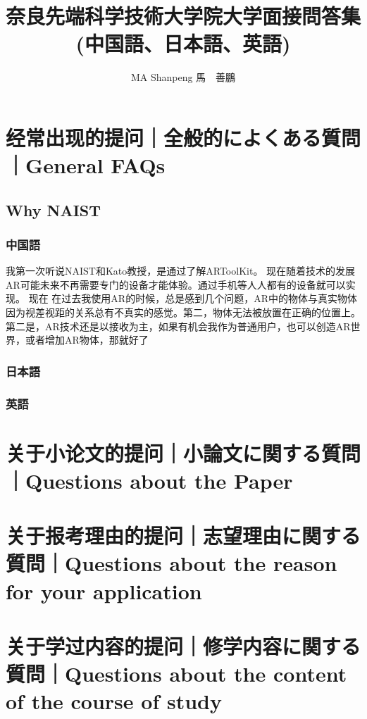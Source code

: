 \documentclass[lang=cn,11pt,a4paper]{elegantpaper}
\title{奈良先端科学技術大学院大学面接問答集\\(中国語、日本語、英語)}
\author{MA Shanpeng 馬　善鵬}
\institute{\href{https://inusturbo.github.io/}{個人ホームページ}}
\date{\zhtoday}
\begin{document}
\maketitle

\begin{abstract}


\end{abstract}

 \tableofcontents
 \newpage
\section{经常出现的提问｜全般的によくある質問｜General FAQs}
\subsection{Why NAIST}
\subsubsection{中国語}
我第一次听说NAIST和Kato教授，是通过了解ARToolKit。
现在随着技术的发展AR可能未来不再需要专门的设备才能体验。通过手机等人人都有的设备就可以实现。
现在
在过去我使用AR的时候，总是感到几个问题，AR中的物体与真实物体因为视差视距的关系总有不真实的感觉。第二，物体无法被放置在正确的位置上。第二是，AR技术还是以接收为主，如果有机会我作为普通用户，也可以创造AR世界，或者增加AR物体，那就好了

\subsubsection{日本語}
\subsubsection{英語}
\section{关于小论文的提问｜小論文に関する質問｜Questions about the Paper}

\section{关于报考理由的提问｜志望理由に関する質問｜Questions about the reason for your application}

\section{关于学过内容的提问｜修学内容に関する質問｜Questions about the content of the course of study}
\end{document}

